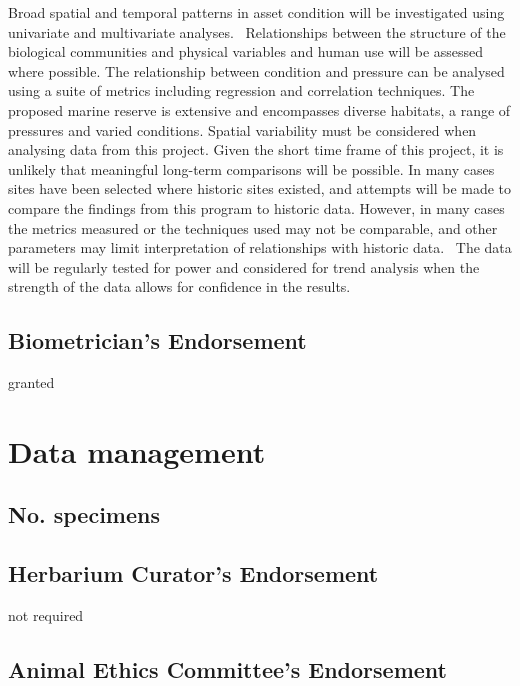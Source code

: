 \documentclass[version=last,
    paper=a4,                               %
    10pt,                                   %
    dvipsnames,
    oneside,                              %
    headings=openany,                       %
    open=any,
    BCOR=7mm,                               %
    DIV=15,     %
]{scrbook}
\begin{document}
Broad spatial and temporal patterns in asset condition will be
investigated using univariate and multivariate analyses.~ Relationships
between the structure of the biological communities and physical
variables and human use will be assessed where possible. The
relationship between condition and pressure can be analysed using a
suite of metrics including regression and correlation techniques. The
proposed marine reserve is extensive and encompasses diverse habitats, a
range of pressures and varied conditions. Spatial variability must be
considered when analysing data from this project. Given the short time
frame of this project, it is unlikely that meaningful long-term
comparisons will be possible. In many cases sites have been selected
where historic sites existed, and attempts will be made to compare the
findings from this program to historic data. However, in many cases the
metrics measured or the techniques used may not be comparable, and other
parameters may limit interpretation of relationships with historic data.
~The data will be regularly tested for power and considered for trend
analysis when the strength of the data allows for confidence in the
results.~




\subsection*{Biometrician's Endorsement}

granted



\section*{Data management}


\subsection*{No. specimens}






\subsection*{Herbarium Curator's Endorsement}

not required




\subsection*{Animal Ethics Committee's Endorsement}
\end{document}

